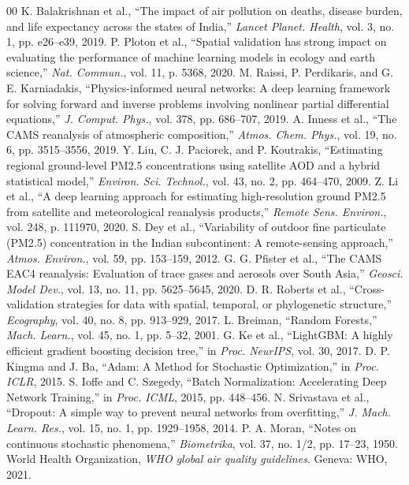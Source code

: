 \documentclass[conference]{IEEEtran}
\begin{document}
\begin{thebibliography}{00}
 K. Balakrishnan et al., ``The impact of air pollution on deaths, disease burden, and life expectancy across the states of India,'' \textit{Lancet Planet. Health}, vol. 3, no. 1, pp. e26--e39, 2019.
 P. Ploton et al., ``Spatial validation has strong impact on evaluating the performance of machine learning models in ecology and earth science,'' \textit{Nat. Commun.}, vol. 11, p. 5368, 2020.
 M. Raissi, P. Perdikaris, and G. E. Karniadakis, ``Physics-informed neural networks: A deep learning framework for solving forward and inverse problems involving nonlinear partial differential equations,'' \textit{J. Comput. Phys.}, vol. 378, pp. 686--707, 2019.
 A. Inness et al., ``The CAMS reanalysis of atmospheric composition,'' \textit{Atmos. Chem. Phys.}, vol. 19, no. 6, pp. 3515--3556, 2019.
 Y. Liu, C. J. Paciorek, and P. Koutrakis, ``Estimating regional ground-level PM2.5 concentrations using satellite AOD and a hybrid statistical model,'' \textit{Environ. Sci. Technol.}, vol. 43, no. 2, pp. 464--470, 2009.
 Z. Li et al., ``A deep learning approach for estimating high-resolution ground PM2.5 from satellite and meteorological reanalysis products,'' \textit{Remote Sens. Environ.}, vol. 248, p. 111970, 2020.
 S. Dey et al., ``Variability of outdoor fine particulate (PM2.5) concentration in the Indian subcontinent: A remote-sensing approach,'' \textit{Atmos. Environ.}, vol. 59, pp. 153--159, 2012.
 G. G. Pfister et al., ``The CAMS EAC4 reanalysis: Evaluation of trace gases and aerosols over South Asia,'' \textit{Geosci. Model Dev.}, vol. 13, no. 11, pp. 5625--5645, 2020.
 D. R. Roberts et al., ``Cross-validation strategies for data with spatial, temporal, or phylogenetic structure,'' \textit{Ecography}, vol. 40, no. 8, pp. 913--929, 2017.
 L. Breiman, ``Random Forests,'' \textit{Mach. Learn.}, vol. 45, no. 1, pp. 5--32, 2001.
 G. Ke et al., ``LightGBM: A highly efficient gradient boosting decision tree,'' in \textit{Proc. NeurIPS}, vol. 30, 2017.
 D. P. Kingma and J. Ba, ``Adam: A Method for Stochastic Optimization,'' in \textit{Proc. ICLR}, 2015.
 S. Ioffe and C. Szegedy, ``Batch Normalization: Accelerating Deep Network Training,'' in \textit{Proc. ICML}, 2015, pp. 448--456.
 N. Srivastava et al., ``Dropout: A simple way to prevent neural networks from overfitting,'' \textit{J. Mach. Learn. Res.}, vol. 15, no. 1, pp. 1929--1958, 2014.
 P. A. Moran, ``Notes on continuous stochastic phenomena,'' \textit{Biometrika}, vol. 37, no. 1/2, pp. 17--23, 1950.
 World Health Organization, \textit{WHO global air quality guidelines}. Geneva: WHO, 2021.
\end{thebibliography}
\end{document}
